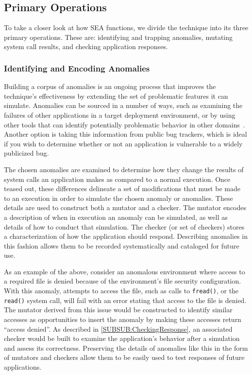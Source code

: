 \subsection{Primary Operations}
\label{SEC:PrimaryOperations}

To take a closer look at how SEA functions,
we divide the technique
into its three primary operations.
These are:
identifying and trapping anomalies,
mutating system call results,
and checking application responses.

\subsubsection{Identifying and Encoding Anomalies}
\label{SUBSUB:IdentifyingAndEncoding}
Building a corpus of anomalies
is an ongoing process that improves the technique's
effectiveness by extending the set of problematic features it can simulate.
Anomalies can be sourced
in a number of ways,
such as
examining the failures of other applications
in a target deployment environment,
or by using other tools that can identify
potentially problematic behavior in other domains~\cite{Zhuang_NSDI_2014,
rasley2015detecting}.
Another option is taking this information from
public bug trackers, which is ideal
if you wish to determine
whether or not an application
is vulnerable to a widely publicized bug.

The chosen anomalies are examined
to determine how they change the results
of system calls an application makes as
compared to a normal execution.
Once teased out,
these differences delineate
a set of modifications
that must be made to an execution
in order to simulate the chosen anomaly or anomalies.
These details are used to
construct both a mutator and a checker.
The mutator encodes
a description of when in execution an anomaly can be simulated,
as well as details of how to conduct that simulation.
The checker
(or set of checkers)
stores a characterization of
how the application should respond.
Describing anomalies in this fashion
allows them to be recorded systematically and cataloged for future use.

As an example of the above, consider
an anomalous environment
where access to a required file is denied because of
the environment's file security configuration.
With this anomaly,
attempts to access the file,
such as calls to {\tt fread()},
or the {\tt read()} system call,
will fail with an error stating that access to the file is denied.
The mutator derived from this issue would be constructed to
identify similar accesses as opportunities
to insert the anomaly
by making these
accesses return ``access denied''.
As described in \ref{SUBSUB:CheckingResponse},
an associated checker would be built to
examine the application's behavior after a simulation and assess its
correctness.
Preserving the details of anomalies like this in the form of
mutators and checkers
allow them to be
easily used
to test responses of future applications.

